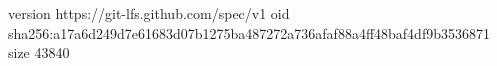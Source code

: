 version https://git-lfs.github.com/spec/v1
oid sha256:a17a6d249d7e61683d07b1275ba487272a736afaf88a4ff48baf4df9b3536871
size 43840
